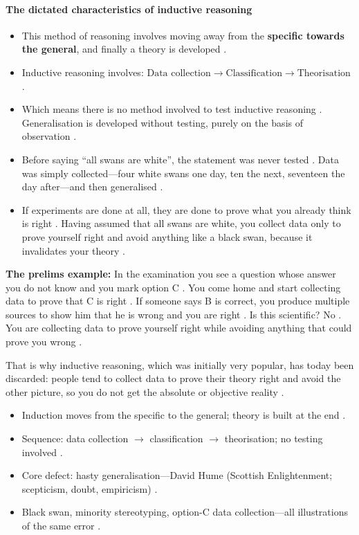 \paragraph{The dictated characteristics of inductive reasoning}
\begin{itemize}
    \item This method of reasoning involves moving away from the \textbf{specific towards the general}, and finally a theory is developed .
    \item Inductive reasoning involves: $\text{Data collection} \longrightarrow \text{Classification} \longrightarrow \text{Theorisation}$ .
    \item Which means there is no method involved to test inductive reasoning . Generalisation is developed without testing, purely on the basis of observation .
    \item Before saying ``all swans are white'', the statement was never tested . Data was simply collected---four white swans one day, ten the next, seventeen the day after---and then generalised .
    \item If experiments are done at all, they are done to prove what you already think is right . Having assumed that all swans are white, you collect data only to prove yourself right and avoid anything like a black swan, because it invalidates your theory .
\end{itemize}

\begin{ExampleBox}
\textbf{The prelims example:} In the examination you see a question whose answer you do not know and you mark option C . You come home and start collecting data to prove that C is right . If someone says B is correct, you produce multiple sources to show him that he is wrong and you are right . Is this scientific? No . You are collecting data to prove yourself right while avoiding anything that could prove you wrong .
\end{ExampleBox}

\begin{CriticalPoint}
That is why inductive reasoning, which was initially very popular, has today been discarded: people tend to collect data to prove their theory right and avoid the other picture, so you do not get the absolute or objective reality .
\end{CriticalPoint}

\begin{QuickRevision}
\begin{itemize}
    \item Induction moves from the specific to the general; theory is built at the end .
    \item Sequence: data collection $\rightarrow$ classification $\rightarrow$ theorisation; no testing involved .
    \item Core defect: hasty generalisation---David Hume (Scottish Enlightenment; scepticism, doubt, empiricism) .
    \item Black swan, minority stereotyping, option-C data collection---all illustrations of the same error .
\end{itemize}
\end{QuickRevision}

